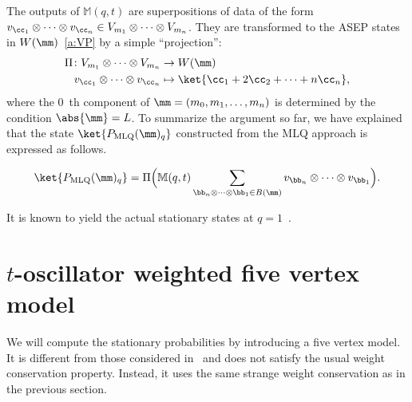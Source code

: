 The outputs of $\mathbb{M}(q,t)$ are superpositions of data of the form $v_{\cc_1}\otimes \cdots \otimes v_{\cc_n} \in V_{m_1} \otimes \cdots \otimes V_{m_n}$.
They are transformed to the ASEP states in $W(\mm)$~\eqref{a:VP} by a simple ``projection'':
\begin{equation}\label{a:Pi}
 \begin{aligned}
 \Pi \colon V_{m_1} \otimes \cdots \otimes V_{m_n} &\rightarrow 
 W(\mm)
 \\
 v_{\cc_1} \otimes \cdots \otimes v_{\cc_n} & \mapsto
 \ket{\cc_1+2\cc_2+\cdots + n\cc_n},
 \end{aligned}
\end{equation}
where the $0$~th component of $\mm = (m_0, m_1, \ldots, m_n)$ is determined by the condition $\abs{\mm} = L$.
To summarize the argument so far, we have explained that the state 
$\ket{P_{\text{MLQ}}(\mm)_q}$ constructed from the 
MLQ approach is expressed as follows.
 
 \begin{prop}\label{a:pr:P}
 \begin{align}
 \ket{P_{\text{MLQ}}(\mm)_q} = 
 \Pi\Bigl(
 \mathbb{M}(q,t)\sum_{\bb_n \otimes \cdots \otimes \bb_1 \in B(\mm)}
 v_{\bb_n} \otimes \cdots \otimes v_{\bb_1} 
 \Bigr).
 \end{align}
 \end{prop}
  It is known to yield the actual stationary states at $q=1$~\cite{Martin20}.

\section{\texorpdfstring{$t$}{t}-oscillator weighted five vertex model}\label{sec:5v}

We will compute the stationary probabilities by introducing a five vertex model.
It is different from those considered in~\cite{KMO1, KMO2} and 
does not satisfy the usual weight conservation property.
Instead, it uses the same strange weight conservation as in the previous section.


